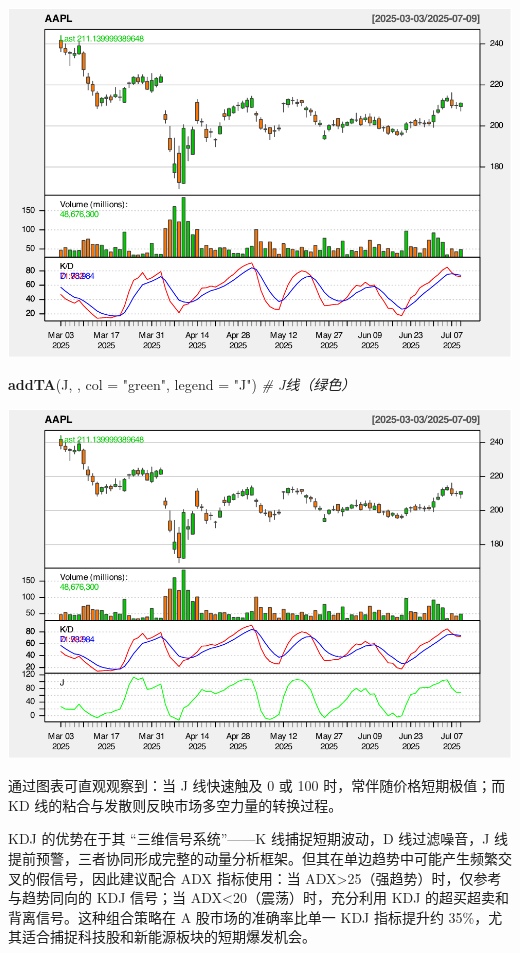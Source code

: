 \documentclass[]{ctexbook}
\newenvironment{Shaded}{\begin{snugshade}}{\end{snugshade}}
\newcommand{\AttributeTok}[1]{\textcolor[rgb]{0.13,0.29,0.53}{#1}}
\newcommand{\CommentTok}[1]{\textcolor[rgb]{0.56,0.35,0.01}{\textit{#1}}}
\newcommand{\FunctionTok}[1]{\textcolor[rgb]{0.13,0.29,0.53}{\textbf{#1}}}
\newcommand{\NormalTok}[1]{#1}
\newcommand{\StringTok}[1]{\textcolor[rgb]{0.31,0.60,0.02}{#1}}
\begin{document}
\includegraphics[width=0.9\linewidth]{quantmod_files/figure-latex/kdj-3}

\begin{Shaded}
\begin{Highlighting}[]
\FunctionTok{addTA}\NormalTok{(J, , }\AttributeTok{col =} \StringTok{"green"}\NormalTok{, }\AttributeTok{legend =} \StringTok{"J"}\NormalTok{)  }\CommentTok{\# J线（绿色）}
\end{Highlighting}
\end{Shaded}

\includegraphics[width=0.9\linewidth]{quantmod_files/figure-latex/kdj-4}

通过图表可直观观察到：当 J 线快速触及 0 或 100 时，常伴随价格短期极值；而 KD 线的粘合与发散则反映市场多空力量的转换过程。

KDJ 的优势在于其 ``三维信号系统''------K 线捕捉短期波动，D 线过滤噪音，J 线提前预警，三者协同形成完整的动量分析框架。但其在单边趋势中可能产生频繁交叉的假信号，因此建议配合 ADX 指标使用：当 ADX\textgreater25（强趋势）时，仅参考与趋势同向的 KDJ 信号；当 ADX\textless20（震荡）时，充分利用 KDJ 的超买超卖和背离信号。这种组合策略在 A 股市场的准确率比单一 KDJ 指标提升约 35\%，尤其适合捕捉科技股和新能源板块的短期爆发机会。
\end{document}
